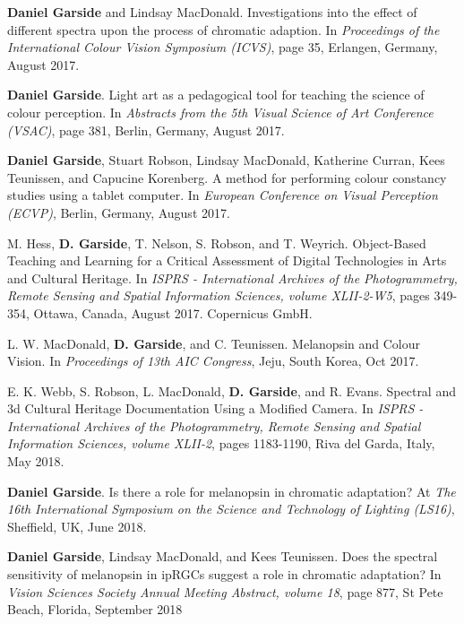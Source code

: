 {\textbf{Daniel Garside} and Lindsay MacDonald. Investigations into the effect of different spectra upon the process of chromatic adaption. In \textit{Proceedings of the International Colour Vision Symposium (ICVS)}, page 35, Erlangen, Germany, August 2017.
\bigskip

\textbf{Daniel Garside}. Light art as a pedagogical tool for teaching the science of colour perception. In \textit{Abstracts from the 5th Visual Science of Art Conference (VSAC)}, page 381, Berlin, Germany, August 2017. 
\bigskip

\textbf{Daniel Garside}, Stuart Robson, Lindsay MacDonald, Katherine Curran, Kees Teunissen, and Capucine Korenberg.  A method for performing colour constancy studies using a tablet computer. In \textit{European Conference on Visual Perception (ECVP)}, Berlin, Germany, August 2017. 
\bigskip

M. Hess, \textbf{D. Garside}, T. Nelson, S. Robson, and T. Weyrich.  Object-Based Teaching and Learning for a Critical Assessment of Digital Technologies in Arts and Cultural Heritage. In \textit{ISPRS - International Archives of the Photogrammetry, Remote Sensing and Spatial Information Sciences, volume XLII-2-W5}, pages 349-354, Ottawa, Canada, August 2017. Copernicus GmbH. 
\bigskip

L. W. MacDonald, \textbf{D. Garside}, and C. Teunissen. Melanopsin and Colour Vision. In \textit{Proceedings of 13th AIC Congress}, Jeju, South Korea, Oct 2017.
\bigskip

E. K. Webb, S. Robson, L. MacDonald, \textbf{D. Garside}, and R. Evans. Spectral and 3d Cultural Heritage Documentation Using a Modified Camera. In \textit{ISPRS - International Archives of the Photogrammetry, Remote Sensing and Spatial Information Sciences, volume XLII-2}, pages 1183-1190, Riva del Garda, Italy, May 2018. 
\bigskip

\textbf{Daniel Garside}. Is there a role for melanopsin in chromatic adaptation? At \textit{The 16th International Symposium on the Science and Technology of Lighting (LS16)}, Sheffield, UK, June 2018.
\bigskip


\textbf{Daniel Garside}, Lindsay MacDonald, and Kees Teunissen. Does the spectral sensitivity of melanopsin in ipRGCs suggest a role in chromatic adaptation?  In \textit{Vision Sciences Society Annual Meeting Abstract, volume 18}, page 877, St Pete Beach, Florida, September 2018 
\bigskip

}
